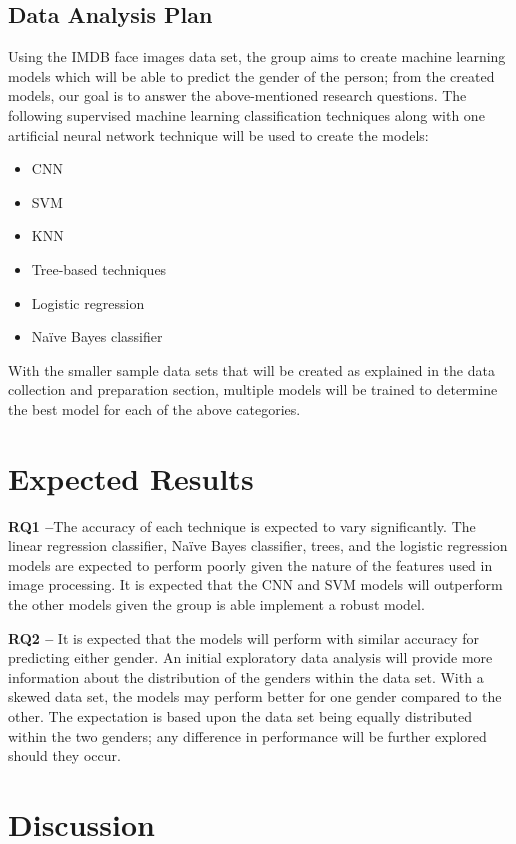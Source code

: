 \documentclass[conference]{IEEEtran}
\begin{document}
\subsection{Data Analysis Plan}
Using the IMDB face images data set, the group aims to create machine learning models which will be
able to predict the gender of the person; from the created models, our goal is to answer the above-mentioned research questions. The following supervised machine learning classification techniques along with one artificial neural network technique will be used to create the models:
\begin{itemize}
  \item CNN
  \item SVM
  \item KNN
  \item Tree-based techniques
  \item Logistic regression
  \item Naïve Bayes classifier
\end{itemize}
With the smaller sample data sets that will be created as explained in the data collection and
preparation section, multiple models will be trained to determine the best model for each of the above
categories.

\section{Expected Results}
\textbf{RQ1 –}The accuracy of each technique is expected to vary significantly. The linear regression classifier,
Naïve Bayes classifier, trees, and the logistic regression models are expected to perform poorly given the
nature of the features used in image processing. It is expected that the CNN and SVM models will
outperform the other models given the group is able implement a robust model.

\textbf{RQ2 –} It is expected that the models will perform with similar accuracy for predicting either gender. An
initial exploratory data analysis will provide more information about the distribution of the genders
within the data set. With a skewed data set, the models may perform better for one gender compared
to the other. The expectation is based upon the data set being equally distributed within the two
genders; any difference in performance will be further explored should they occur.


\section{Discussion}
\end{document}
